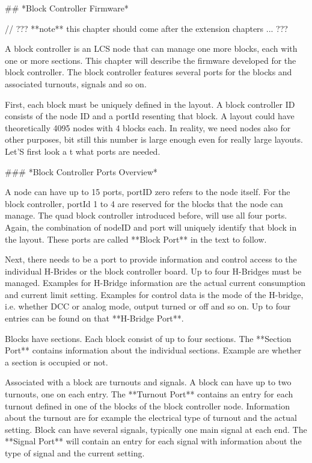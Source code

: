 ## *Block Controller Firmware*

// ??? **note** this chapter should come after the extension chapters ... ???

A block controller is an LCS node that can manage one more blocks, each with one or more sections. This chapter will describe the firmware developed for the block controller. The block controller features several ports for the blocks and associated turnouts, signals and so on.

First, each block must be uniquely defined in the layout. A block controller ID consists of the node ID and a portId resenting that block. A layout could have theoretically 4095 nodes with 4 blocks each. In reality, we need nodes also for other purposes, bit still this number is large enough even for really large layouts. Let'S first look a t what ports are needed.

### *Block Controller Ports Overview*

A node can have up to 15 ports, portID zero refers to the node itself. For the block controller, portId 1 to 4 are reserved for the blocks that the node can manage. The quad block controller introduced before, will use all four ports. Again, the combination of nodeID and port will uniquely identify that block in the layout. These ports are called **Block Port** in the text to follow.

Next, there needs to be a port to provide information and control access to the individual H-Brides or the block controller board. Up to four H-Bridges must be managed. Examples for H-Bridge information are the actual current consumption and current limit setting. Examples for control data is the mode of the H-bridge, i.e. whether DCC or analog mode, output turned or off and so on. Up to four entries can be found on that **H-Bridge Port**.

Blocks have sections. Each block consist of up to four sections. The **Section Port** contains information about the individual sections. Example are whether a section is occupied or not.

Associated with a block are turnouts and signals. A block can have up to two turnouts, one on each entry. The **Turnout Port** contains an entry for each turnout defined in one of the blocks of the block controller node. Information about the turnout are for example the electrical type of turnout and the actual setting. Block can have several signals, typically one main signal at each end. The **Signal Port** will contain an entry for each signal with information about the  type of signal and the current setting.

